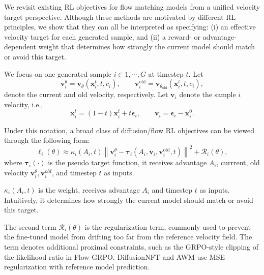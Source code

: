\documentclass{article} %
\begin{document}
We revisit existing RL objectives for flow matching models from a unified
velocity target perspective. Although these methods are motivated by different
RL principles, we show that they can all be interpreted as specifying: (i) an
effective velocity target for each generated sample, and (ii) a reward- or
advantage-dependent weight that determines how strongly the current model should
match or avoid this target.

We focus on one generated sample $i \in {1, \cdots, G}$ at timestep $t$.
Let
\[
\mathbf{v}_i^\theta
=
\mathbf{v}_\theta(\mathbf{x}_{i}^t,t,c_i),
\qquad
\mathbf{v}_i^{\mathrm{old}}
=
\mathbf{v}_{\theta_{\mathrm{old}}}(\mathbf{x}_{i}^t,t,c_i),
\]
denote the current and old velocity, respectively. Let
$\mathbf{v}_i$ denote the sample $i$ velocity, i.e., 
\begin{equation}
\mathbf{x}_{i}^t
=
(1-t)\mathbf{x}_i^t
+
t\boldsymbol{\epsilon}_i,
\qquad
\mathbf{v}_i
=
\boldsymbol{\epsilon}_i-\mathbf{x}_i^0 .
\end{equation}

Under this notation, a broad class of diffusion/flow RL objectives can be
viewed through the following  form:
\begin{equation}
\label{eq:unified_form}
\ell_i(\theta)
\approx
\kappa_i(A_i,t)
\left\|
\mathbf{v}_i^\theta
-
\mathbf{\tau}_i
\left(
A_i,
\mathbf{v}_i,
\mathbf{v}_i^{\mathrm{old}},
t
\right)
\right\|^2
+
\mathcal{R}_i(\theta),
\end{equation}
where $\mathbf{\tau}_i(\cdot)$ is the pseudo target function, it receives advantage $A_i$, currrent, old velocity $\mathbf{v}_i^{\theta}, \mathbf{v}_i^{old}$, and timestep $t$ as inputs.


$\kappa_i(A_i,t)$ is the weight, receives advantage $A_i$ and timestep $t$ as inputs. Intuitively, it
determines how strongly the current model should match or
avoid this target.


The second term $\mathcal{R}_i(\theta)$  is the 
regularization term, commonly used to prevent the fine-tuned model
from drifting too far from the reference velocity field. The term
denotes additional proximal constraints, such as the
GRPO-style clipping of the likelihood ratio in Flow-GRPO. DiffusionNFT and
AWM use MSE regularization with reference model prediction.
\end{document}
